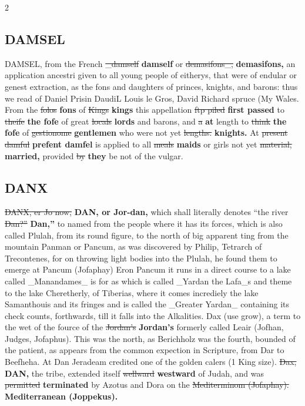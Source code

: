 \documentclass[10pt]{article}
\begin{document}
\begin{multicols}{2}
\subsection*{DAMSEL}
DAMSEL, from the French \sout{\_damself} \textbf{damself} or \sout{demasifons\_,} \textbf{demasifons,} an application ancestri given to all young people of eitherys, that were of endular or genest extraction, as the fons and daughters of princes, knights, and barons: thus we read of Daniel Prisin DaudiL Louis le Gros, David Richard spruce (My Wales. From the \sout{folos} \textbf{fons} of \sout{Kings} \textbf{kings} this appellation \sout{ftp piled} \textbf{first passed} to \sout{theife} \textbf{the fofe} of great \sout{locals} \textbf{lords} and barons, and \sout{a} \textbf{at} length to \sout{think} \textbf{the fofe} of \sout{gestionome} \textbf{gentlemen} who were not yet \sout{lengths.} \textbf{knights.} At \sout{present damful} \textbf{prefent damfel} is applied to all \sout{meals} \textbf{maids} or girls not yet \sout{material,} \textbf{married,} provided \sout{by} \textbf{they} be not of the vulgar.

\subsection*{DANX}
\sout{DANX, er Jo now,} \textbf{DAN, or Jor-dan,} which shall literally denotes “the river \sout{Dan?”} \textbf{Dan,”} to named from the people where it has its forces, which is also called Plulah, from its round figure, to the north of big apparent ting from the mountain Panman or Pancum, as was discovered by Philip, Tetrarch of Trecontenes, for on throwing light bodies into the Plulah, he found them to emerge at Pancum (Jofaphay) Eron Pancum it runs in a direct course to a lake called \_Manandames\_ is for as which is called \_Yardan the Lafa\_s and theme to the lake Cheretherly, of Tiberias, where it comes incrediely the lake Samanthouis and its fringes and is called the \_Greater Yardan\_ containing its check counts, forthwards, till it falls into the Alkalities. Dax (use grow), a term to the wet of the fource of the \sout{Jordan’s} \textbf{Jordan's} formerly called Leair (Jofhan, Judges, Jofaphus). This was the north, as Berichholz was the fourth, bounded of the patient, as appears from the common expection in Scripture, from Dar to Beefheha. At Dan Jeradeam credited one of the golden calers (1 King size). \sout{Dax,} \textbf{DAN,} the tribe, extended itself \sout{wellward} \textbf{westward} of Judah, and was \sout{permitted} \textbf{terminated} by Azotus and Dora on the \sout{Mediterminom (Jofaphay).} \textbf{Mediterranean (Joppekus).}


\end{multicols}
\end{document}
